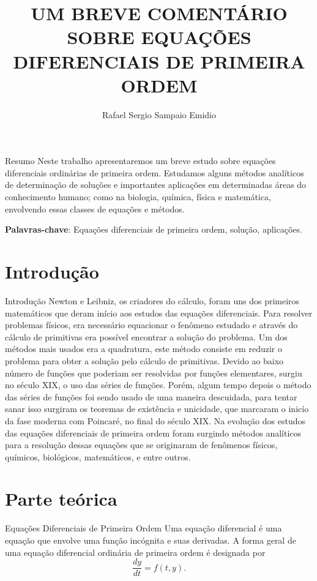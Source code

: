 \documentclass[blue]{beamer}
\title[UFPA]{UM BREVE COMENTÁRIO SOBRE EQUAÇÕES
	DIFERENCIAIS DE PRIMEIRA ORDEM}
\author{Rafael Sergio Sampaio Emidio}
\institute
	{ Trabalho de Conclusão de Curso \\
Instituto de Ciências Exatas e Naturais\\
Orientador: Augusto César dos Reis Costa}
\numberwithin{equation}{section}
\begin{document}
\frame{\titlepage}

\begin{frame}{Resumo}
	\justifying
\hspace{0.2cm} Neste trabalho apresentaremos um breve estudo sobre equações diferenciais ordinárias de primeira ordem. Estudamos alguns métodos analíticos de determinação de soluções e importantes aplicações em determinadas áreas do conhecimento humano; como na biologia, química, física e matemática, envolvendo essas classes de equações e métodos.

\begin{flushleft}
	\justifying
	\textbf{Palavras-chave}: Equações diferenciais de primeira ordem, solução, aplicações.
\end{flushleft}

\end{frame}

\section{Introdução}

\begin{frame}{Introdução}
	\justifying
\hspace{0.2cm} Newton e Leibniz, os criadores do cálculo, foram uns dos primeiros matemáticos que deram início aos estudos das equações diferenciais. Para resolver problemas físicos, era necessário equacionar o fenômeno estudado e através do cálculo de primitivas era possível encontrar a solução do problema. Um dos métodos mais usados era a quadratura, este método consiste em reduzir o problema para obter a solução pelo cálculo de primitivas. Devido ao baixo número de funções que poderiam ser resolvidas por funções elementares, surgiu no século XIX, o uso das séries de funções. Porém, algum tempo depois o método das séries de funções foi sendo usado de uma maneira descuidada, para tentar sanar isso surgiram os teoremas de existência e unicidade, que marcaram o inicío da fase moderna com Poincaré, no final do século XIX. Na evolução dos estudos das equações diferenciais de primeira ordem foram surgindo métodos analíticos para a resolução dessas equações que se originaram de fenômenos físicos, químicos, biológicos, matemáticos, e entre outros.

\end{frame}

\section{Parte teórica}
\begin{frame}{Equações Diferenciais de Primeira Ordem}
	\justifying
\hspace{0.2cm} Uma equação diferencial é uma equação que envolve uma função incógnita e suas derivadas. A forma geral de uma equação diferencial ordinária de primeira ordem é designada por
$$\dfrac{dy}{dt}=f(t,y).$$


\end{frame}
\end{document}
